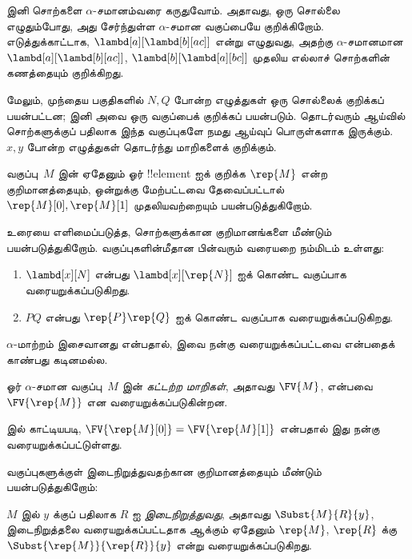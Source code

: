 \documentclass[../../../include/open-logic-section]{subfiles}
\begin{document}

இனி சொற்களை $\alpha$-சமானம்வரை கருதுவோம். அதாவது, ஒரு சொல்லை எழுதும்போது,
அது சேர்ந்துள்ள $\alpha$-சமான வகுப்பையே குறிக்கிறோம். எடுத்துக்காட்டாக,
$\lambd[a][\lambd[b][a c]]$ என்று எழுதுவது, அதற்கு $\alpha$-சமானமான
$\lambd[a][\lambd[b][a c]]$, $\lambd[b][\lambd[a][b c]]$ முதலிய எல்லாச்
சொற்களின் கணத்தையும் குறிக்கிறது.

மேலும், முந்தைய பகுதிகளில் $N, Q$ போன்ற எழுத்துகள் ஒரு சொல்லைக் குறிக்கப்
பயன்பட்டன; இனி அவை ஒரு வகுப்பைக் குறிக்கப் பயன்படும். தொடர்வரும் ஆய்வில்
சொற்களுக்குப் பதிலாக இந்த வகுப்புகளே நமது ஆய்வுப் பொருள்களாக இருக்கும்.
$x, y$ போன்ற எழுத்துகள் தொடர்ந்து மாறிகளைக் குறிக்கும்.

வகுப்பு~$M$ இன் ஏதேனும் ஓர் !!{element} ஐக் குறிக்க $\rep{M}$ என்ற
குறிமானத்தையும், ஒன்றுக்கு மேற்பட்டவை தேவைப்பட்டால்
$\rep{M}[0], \rep{M}[1]$ முதலியவற்றையும் பயன்படுத்துகிறோம்.

உரையை எளிமைப்படுத்த, சொற்களுக்கான குறிமானங்களை மீண்டும் பயன்படுத்துகிறோம்.
வகுப்புகளின்மீதான பின்வரும் வரையறை நம்மிடம் உள்ளது:
\begin{defn}
  \begin{enumerate}
  \item $\lambd[x][N]$ என்பது $\lambd[x][\rep{N}]$ ஐக் கொண்ட வகுப்பாக
    வரையறுக்கப்படுகிறது.
  \item $PQ$ என்பது $\rep{P}\rep{Q}$ ஐக் கொண்ட வகுப்பாக வரையறுக்கப்படுகிறது.
  \end{enumerate}
\end{defn}

$\alpha$-மாற்றம் இசைவானது என்பதால், இவை நன்கு வரையறுக்கப்பட்டவை என்பதைக்
காண்பது கடினமல்ல.

\begin{defn} 
  ஓர் $\alpha$-சமான வகுப்பு~$M$ இன் \emph{கட்டற்ற மாறிகள்}, அதாவது
  $\FV{M}$, என்பவை $\FV{\rep{M}}$ என வரையறுக்கப்படுகின்றன.
\end{defn}

 இல் காட்டியபடி,
$\FV{\rep{M}[0]} = \FV{\rep{M}[1]}$ என்பதால் இது நன்கு வரையறுக்கப்பட்டுள்ளது.

வகுப்புகளுக்குள் இடைநிறுத்துவதற்கான குறிமானத்தையும் மீண்டும் பயன்படுத்துகிறோம்:
\begin{defn} 
  $M$ இல் $y$ க்குப் பதிலாக $R$ ஐ \emph{இடைநிறுத்துவது}, அதாவது
  $\Subst{M}{R}{y}$, இடைநிறுத்தலை வரையறுக்கப்பட்டதாக ஆக்கும் ஏதேனும்
  $\rep{M}$, $\rep{R}$ க்கு $\Subst{\rep{M}}{\rep{R}}{y}$ என்று
  வரையறுக்கப்படுகிறது.
\end{defn}
\end{document}
